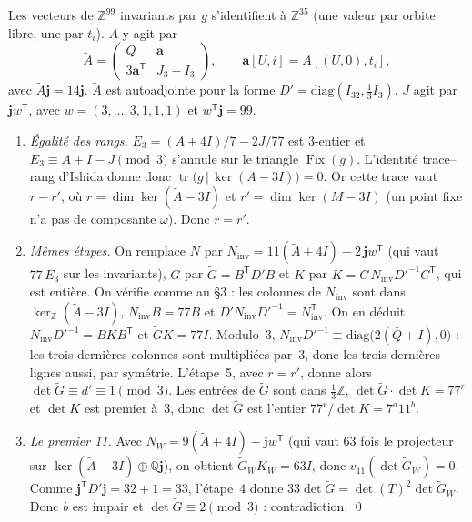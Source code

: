 \documentclass[11pt,a4paper]{article}
\theoremstyle{remark}
\newcommand{\Z}{\mathbb{Z}}
\newcommand{\Q}{\mathbb{Q}}
\newcommand{\one}{\mathbf{j}}
\newcommand{\Fix}{\operatorname{Fix}}
\newcommand{\tr}{\operatorname{tr}}
\begin{document}
Les vecteurs de $\Z^{99}$ invariants par $g$ s'identifient à $\Z^{35}$ (une valeur par orbite libre, une par $t_i$). $A$ y agit
par
\[
\tilde A=\begin{pmatrix}Q&\mathbf a\\3\mathbf a^{\mathsf T}&J_3-I_3\end{pmatrix},\qquad \mathbf a[U,i]=A[(U,0),t_i],
\]
avec $\tilde A\one=14\one$. $\tilde A$ est autoadjointe pour la forme $D'=\mathrm{diag}(I_{32},\tfrac13 I_3)$. $J$ agit par
$\one w^{\mathsf T}$, avec $w=(3,\dots,3,1,1,1)$ et $w^{\mathsf T}\one=99$.

\begin{enumerate}[leftmargin=*,nosep]
\item \emph{Égalité des rangs.} $E_3=(A+4I)/7-2J/77$ est 3-entier et $E_3\equiv A+I-J\pmod 3$ s'annule sur le triangle
$\Fix(g)$. L'identité trace--rang d'Ishida \cite[cor.~4.2]{I26} donne donc $\tr\bigl(g\,|\,\ker(A-3I)\bigr)=0$. Or cette trace vaut
$r-r'$, où $r=\dim\ker(\tilde A-3I)$ et $r'=\dim\ker(M-3I)$ (un point fixe n'a pas de composante $\omega$). Donc $r=r'$.
\item \emph{Mêmes étapes.} On remplace $N$ par $N_{\mathrm{inv}}=11(\tilde A+4I)-2\,\one w^{\mathsf T}$ (qui vaut $77\,E_3$ sur les
invariants), $G$ par $\tilde G=B^{\mathsf T}D'B$ et $K$ par $K=C\,N_{\mathrm{inv}}D'^{-1}C^{\mathsf T}$, qui est entière. On vérifie
comme au §3 : les colonnes de $N_{\mathrm{inv}}$ sont dans $\ker_\Z(\tilde A-3I)$, $N_{\mathrm{inv}}B=77B$ et
$D'N_{\mathrm{inv}}D'^{-1}=N_{\mathrm{inv}}^{\mathsf T}$. On en déduit $N_{\mathrm{inv}}D'^{-1}=BKB^{\mathsf T}$ et $\tilde GK=77I$.
Modulo~3, $N_{\mathrm{inv}}D'^{-1}\equiv\mathrm{diag}\bigl(2(\bar Q+I),0\bigr)$ : les trois dernières colonnes sont multipliées par~3,
donc les trois dernières lignes aussi, par symétrie. L'étape~5, avec $r=r'$, donne alors $\det\tilde G\equiv d'\equiv1\pmod3$.
Les entrées de $\tilde G$ sont dans $\tfrac13\Z$, $\det\tilde G\cdot\det K=77^r$ et $\det K$ est premier à~3, donc $\det\tilde G$ est l'entier $77^r/\det K=7^a11^b$.
\item \emph{Le premier 11.} Avec $N_W=9(\tilde A+4I)-\one w^{\mathsf T}$ (qui vaut $63$ fois le projecteur sur
$\ker(\tilde A-3I)\oplus\Q\one$), on obtient $\tilde G_WK_W=63I$, donc $v_{11}(\det\tilde G_W)=0$. Comme
$\one^{\mathsf T}D'\one=32+1=33$, l'étape~4 donne $33\det\tilde G=\det(T)^2\det\tilde G_W$. Donc $b$ est impair et
$\det\tilde G\equiv2\pmod3$ : contradiction. \qed
\end{enumerate}
\end{document}
